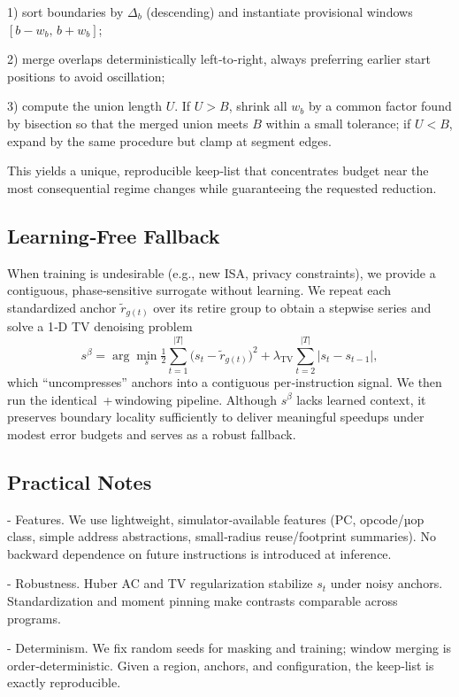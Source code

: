 1) sort boundaries by \(\Delta_b\) (descending) and instantiate provisional windows \([b-w_b,\,b+w_b]\);

2) merge overlaps deterministically left‑to‑right, always preferring earlier start positions to avoid oscillation;

3) compute the union length \(U\). If \(U>B\), shrink all \(w_b\) by a common factor found by bisection so that the merged union meets \(B\) within a small tolerance; if \(U<B\), expand by the same procedure but clamp at segment edges.

This yields a unique, reproducible keep‑list that concentrates budget near the most consequential regime changes while guaranteeing the requested reduction.


\subsection{Learning‑Free Fallback}\label{subsec:beta}
When training is undesirable (e.g., new ISA, privacy constraints), we provide a contiguous, phase‑sensitive surrogate without learning. We repeat each standardized anchor \(\tilde{r}_{g(t)}\) over its retire group to obtain a stepwise series and solve a 1‑D TV denoising problem
\[
s^{\beta}=\arg\min_s \tfrac{1}{2}\sum_{t=1}^{|T|}\big(s_t-\tilde{r}_{g(t)}\big)^2+\lambda_{\mathrm{TV}}\!\sum_{t=2}^{|T|}|s_t-s_{t-1}|,
\]
which “uncompresses” anchors into a contiguous per‑instruction signal. We then run the identical \cpd\,+\,windowing pipeline. Although \(s^{\beta}\) lacks learned context, it preserves boundary locality sufficiently to deliver meaningful speedups under modest error budgets and serves as a robust fallback.

\subsection{Practical Notes}
- Features. We use lightweight, simulator‑available features (PC, opcode/µop class, simple address abstractions, small‑radius reuse/footprint summaries). No backward dependence on future instructions is introduced at inference.

- Robustness. Huber AC and TV regularization stabilize \(s_t\) under noisy anchors. Standardization and moment pinning make contrasts comparable across programs.

- Determinism. We fix random seeds for masking and training; window merging is order‑deterministic. Given a region, anchors, and configuration, the keep‑list is exactly reproducible.




